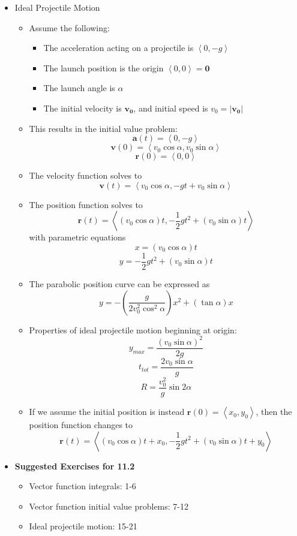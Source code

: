 \documentclass[12pt]{article}
\renewcommand{\vec}[1]{\mathbf{#1}}
\newcommand{\<}{\left<}
\renewcommand{\>}{\right>}
\begin{document}
\begin{itemize}
      \item Ideal Projectile Motion 
        \begin{itemize}
        \item Assume the following:
          \begin{itemize}
            \item The acceleration acting on a projectile is $\<0,-g\>$
            \item The launch position is the origin $\<0,0\>=\vec{0}$
            \item The launch angle is $\alpha$
            \item The initial velocity is $\vec{v_0}$, and initial speed is $v_0=|\vec{v_0}|$
          \end{itemize}
        \item This results in the initial value problem:
          \[\vec{a}(t) = \<0,-g\>\]
          \[\vec{v}(0) = \<v_0\cos\alpha,v_0\sin\alpha\>\]
          \[\vec{r}(0) = \<0,0\> \]
        \item The velocity function solves to \[\vec{v}(t) = \<v_0\cos\alpha,-gt+v_0\sin\alpha\>\]
        \item The position function solves to 
          \[\vec{r}(t) = \<(v_0\cos\alpha)t,-\frac{1}{2}gt^2+(v_0\sin\alpha)t\>\]
          with parametric equations 
          \[x=(v_0\cos\alpha)t\] \[y=-\frac{1}{2}gt^2+(v_0\sin\alpha)t\]
        \item The parabolic position curve can be expressed as \[y = -\left(\frac{g}{2v_0^2\cos^2\alpha}\right)x^2+(\tan\alpha)x\]
        \item Properties of ideal projectile motion beginning at origin:
          \[y_{max} = \frac{(v_0\sin\alpha)^2}{2g}\]
          \[t_{tot} = \frac{2v_0\sin\alpha}{g}\]
          \[R = \frac{v_0^2}{g}\sin2\alpha\]
        \item If we assume the initial position is instead $\vec{r}(0)=\<x_0,y_0\>$, then the position function changes to \[\vec{r}(t)=\<(v_0\cos\alpha)t+x_0,-\frac{1}{2}gt^2+(v_0\sin\alpha)t+y_0\>\]
        \end{itemize}
      \item \textbf{Suggested Exercises for 11.2}
        \begin{itemize}
        \item Vector function integrals: 1-6
        \item Vector function initial value problems: 7-12
        \item Ideal projectile motion: 15-21
        \end{itemize}
    \end{itemize}
  
\end{document}
